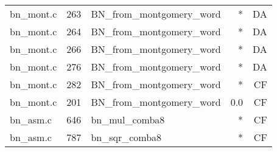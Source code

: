 \begin{table}[!ht]
\begin{tabular}{lrlrr}
bn\_mont.c& 263&BN\_from\_montgomery\_word&*&DA\\
bn\_mont.c& 264&BN\_from\_montgomery\_word&*&DA\\
bn\_mont.c& 266&BN\_from\_montgomery\_word&*&DA\\
bn\_mont.c& 276&BN\_from\_montgomery\_word&*&DA\\
bn\_mont.c& 282&BN\_from\_montgomery\_word&*&CF\\
bn\_mont.c& 201&BN\_from\_montgomery\_word&0.0 &CF\\
bn\_asm.c& 646&bn\_mul\_comba8&*&CF\\
bn\_asm.c& 787&bn\_sqr\_comba8&*&CF\\
\hline
\end{tabular}
\renewcommand{\baselinestretch}{1.0}\selectfont
\end{table}
